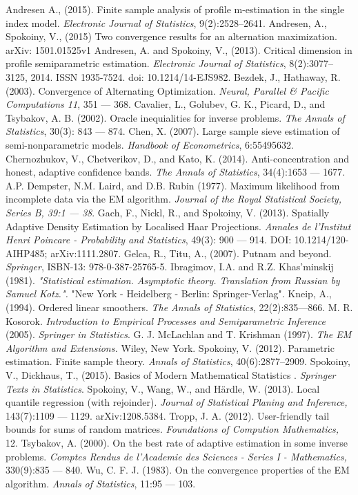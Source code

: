 \begin{thebibliography}{9}
Andresen A., (2015). Finite sample analysis of profile m-estimation in the single index model. \emph{Electronic Journal of Statistics}, 9(2):2528--2641. 
Andresen, A., Spokoiny, V., (2015) Two convergence results for an alternation maximization. arXiv: 1501.01525v1
Andresen, A. and Spokoiny, V., (2013). Critical dimension in profile semiparametric estimation. 
\emph{Electronic Journal of Statistics}, 8(2):3077--3125, 2014. ISSN 1935-7524. doi: 10.1214/14-EJS982.
Bezdek, J., Hathaway, R. (2003). Convergence of Alternating Optimization. \emph{Neural, Parallel \& Pacific Computations 11}, 351 --- 368.  
Cavalier, L., Golubev, G. K., Picard, D., and Tsybakov, A. B. (2002). Oracle inequialities for inverse problems. \emph{The Annals of Statistics}, 30(3): 843 --- 874.
Chen, X. (2007). Large sample sieve estimation of semi-nonparametric models. \emph{Handbook of Econometrics}, 6:55495632.
Chernozhukov, V., Chetverikov, D., and Kato, K. (2014). Anti-concentration and honest, adaptive confidence bands. \emph{The Annals of Statistics}, 34(4):1653 --- 1677.
A.P. Dempster, N.M. Laird, and D.B. Rubin (1977). Maximum likelihood from incomplete data via the EM algorithm. \emph{Journal of the Royal Statistical Society, Series B, 39:1 --- 38}.
Gach, F., Nickl, R., and Spokoiny, V. (2013). Spatially Adaptive Density Estimation by Localised Haar Projections. \emph{Annales de l'Institut Henri Poincare - Probability and Statistics}, 49(3): 900 --- 914. DOI: 10.1214/120-AIHP485; arXiv:1111.2807.
Gelca, R., Titu, A., (2007). Putnam and beyond. \emph{Springer}, ISBN-13: 978-0-387-25765-5.
Ibragimov, I.A. and R.Z. Khas'minskij (1981). \emph{"Statistical estimation. Asymptotic theory. Translation from Russian by Samuel Kotz.".} "New York - Heidelberg - Berlin: Springer-Verlag". 
Kneip, A., (1994). Ordered linear smoothers. \emph{The Annals of Statistics}, 22(2):835---866.
M. R. Kosorok. \emph{Introduction to Empirical Processes and Semiparametric Inference} (2005). \emph{Springer in Statistics}.
G. J. McLachlan and T. Krishman (1997). \emph{The EM Algorithm and Extensions.} Wiley, New York.
Spokoiny, V. (2012). Parametric estimation. Finite sample theory. \emph{Annals of Statistics}, 40(6):2877--2909.
Spokoiny, V., Dickhaus, T., (2015). Basics of Modern Mathematical Statistics . \emph{Springer Texts in Statistics}.
Spokoiny, V., Wang, W., and H\"ardle, W. (2013). Local quantile regression (with rejoinder). \emph{Journal of Statistical Planing and Inference,} 143(7):1109 --- 1129. arXiv:1208.5384.
Tropp, J. A. (2012). User-friendly tail bounds for sums of random matrices. \emph{Foundations of Compution Mathematics,} 12.
Tsybakov, A. (2000). On the best rate of adaptive estimation in some inverse problems. \emph{Comptes Rendus de l'Academie des Sciences - Series I - Mathematics,} 330(9):835 --- 840.
Wu, C. F. J. (1983). On the convergence properties of the EM algorithm. \emph{Annals of Statistics}, 11:95 --- 103.
\end{thebibliography}
